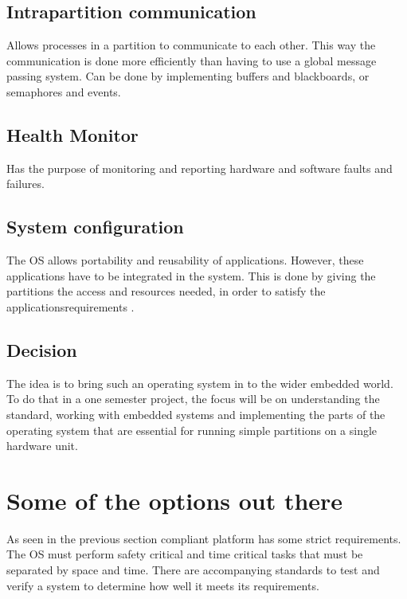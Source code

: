 \subsection{Intrapartition communication}
Allows processes in a partition to communicate to each other. This way
the communication is done more efficiently than having to use a 
global message passing system.
Can be done by implementing buffers and blackboards, or semaphores and 
events.

\subsection{Health Monitor}
Has the purpose of monitoring and reporting hardware and software faults
and failures.

\subsection{System configuration}
The OS allows portability and reusability of applications. However,
these applications have to be integrated in the system. This is done
by giving the partitions the access and resources needed, in order to
satisfy the applications\textquotesingle requirements \cite{page_42}.

\subsection{Decision}
The idea is to bring such an operating system in to the wider embedded world.
To do that in a one semester project, the focus will be on understanding the standard,
working with embedded systems and implementing the parts of the operating system that are
essential for running simple partitions on a single hardware unit.

\section{Some of the options out there}

As seen in the previous section \arinc{} compliant platform has some strict requirements.
The OS must perform safety critical and time critical tasks that must be separated by space and time.
There are accompanying standards to test and verify a system to determine how well it meets its requirements.

